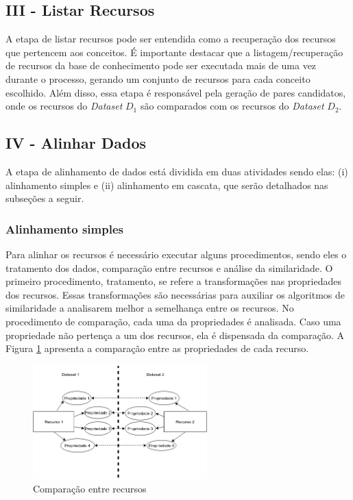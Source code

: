 \subsection{III - Listar Recursos}
A etapa de listar recursos pode ser entendida como a recuperação dos recursos que pertencem aos conceitos. É importante destacar que a listagem/recuperação de recursos da base de conhecimento pode ser executada mais de uma vez durante o processo, gerando um conjunto de recursos para cada conceito escolhido. Além disso, essa etapa é responsável pela geração de pares candidatos, onde os recursos do \textit{Dataset} $D_{1}$ são comparados com os recursos do \textit{Dataset} $D_{2}$.


\subsection{IV - Alinhar Dados}
A etapa de alinhamento de dados está dividida em duas atividades sendo elas: (i) alinhamento simples e (ii) alinhamento em cascata, que serão detalhados nas subseções a seguir.

\subsubsection{Alinhamento simples}
\label{im_simples}
Para alinhar os recursos é necessário executar alguns procedimentos, sendo eles o tratamento dos dados, comparação entre recursos e análise da similaridade. O primeiro procedimento, tratamento, se refere a transformações nas propriedades dos recursos. Essas transformações são necessárias para auxiliar os algoritmos de similaridade a analisarem melhor a semelhança entre os recursos. No procedimento de comparação, cada uma da propriedades é analisada. Caso uma propriedade não pertença a um dos recursos, ela é dispensada da comparação. A Figura  \ref{fig:resources} apresenta a comparação entre as propriedades de cada recurso.

\begin{figure}[!h]
	\centering
	\includegraphics[width=0.6\textwidth]{./imagens/resources.png}
    \caption{Comparação entre recursos}
	\label{fig:resources}
\end{figure}


